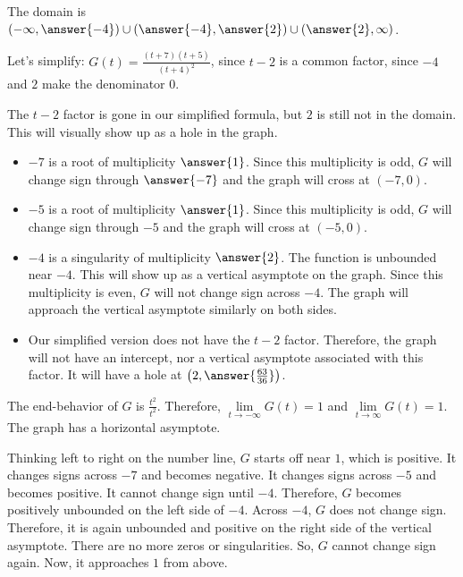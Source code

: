 \documentclass{ximera}
\begin{document}
\begin{explanation}



The domain is $\left( -\infty, \answer{-4} \right) \cup \left(\answer{-4}, \answer{2} \right) \cup \left( \answer{2}, \infty \right)$.

Let's simplify: $G(t) = \frac{(t+7)(t+5)}{(t+4)^2}$, since $t-2$ is a common factor, since $-4$ and $2$ make the denominator $0$.



The $t-2$ factor is gone in our simplified formula, but $2$ is still not in the domain.  This will visually show up as a hole in the graph.



\begin{itemize}
\item $-7$ is a root of multiplicity $\answer{1}$.  Since this multiplicity is odd, $G$ will change sign through $\answer{-7}$ and the graph will cross at $(-7,0)$.
\item $-5$ is a root of multiplicity $\answer{1}$.  Since this multiplicity is odd, $G$ will change sign through $-5$ and the graph will cross at $(-5,0)$.
\item $-4$ is a singularity of multiplicity $\answer{2}$.  The function is unbounded near $-4$.  This will show up as a vertical asymptote on the graph. Since this multiplicity is even, $G$ will not change sign across $-4$.  The graph will approach the vertical asymptote similarly on both sides.
\item Our simplified version does not have the $t-2$ factor.  Therefore, the graph will not have an intercept, nor a vertical asymptote associated with this factor.  It will have a hole at $\left( 2, \answer{\frac{63}{36}} \right)$.
\end{itemize}


The end-behavior of $G$ is $\frac{t^2}{t^2}$.  Therefore, $\lim\limits_{t \to -\infty}G(t) = 1$ and $\lim\limits_{t \to \infty}G(t) = 1$.  The graph has a horizontal asymptote.




Thinking left to right on the number line, $G$ starts off near $1$, which is positive.  It changes signs across $-7$ and becomes negative. It changes signs across $-5$ and becomes positive.  It cannot change sign until $-4$.  Therefore, $G$ becomes positively unbounded on the left side of $-4$.  Across $-4$, $G$ does not change sign.  Therefore, it is again unbounded and positive on the right side of the vertical asymptote.  There are no more zeros or singularities.  So, $G$ cannot change sign again.  Now, it approaches $1$ from above.





\end{explanation}
\end{document}
